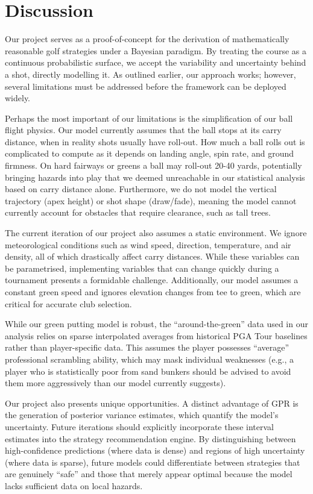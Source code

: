 \documentclass[11pt, letterpaper]{article}
\begin{document}
\section{Discussion}
\label{sec:Discussion}

Our project serves as a proof-of-concept for the derivation of mathematically reasonable golf strategies under a Bayesian paradigm. By treating the course as a continuous probabilistic surface, we accept the variability and uncertainty behind a shot, directly modelling it. As outlined earlier, our approach works; however, several limitations must be addressed before the framework can be deployed widely.

Perhaps the most important of our limitations is the simplification of our ball flight physics. Our model currently assumes that the ball stops at its carry distance, when in reality shots usually have roll-out. How much a ball rolls out is complicated to compute as it depends on landing angle, spin rate, and ground firmness. On hard fairways or greens a ball may roll-out 20-40 yards, potentially bringing hazards into play that we deemed unreachable in our statistical analysis based on carry distance alone. Furthermore, we do not model the vertical trajectory (apex height) or shot shape (draw/fade), meaning the model cannot currently account for obstacles that require clearance, such as tall trees.

The current iteration of our project also assumes a static environment. We ignore meteorological conditions such as wind speed, direction, temperature, and air density, all of which drastically affect carry distances. While these variables can be parametrised, implementing variables that can change quickly during a tournament presents a formidable challenge. Additionally, our model assumes a constant green speed and ignores elevation changes from tee to green, which are critical for accurate club selection.

While our green putting model is robust, the ``around-the-green'' data used in our analysis relies on sparse interpolated averages from historical PGA Tour baselines rather than player-specific data. This assumes the player possesses ``average'' professional scrambling ability, which may mask individual weaknesses (e.g., a player who is statistically poor from sand bunkers should be advised to avoid them more aggressively than our model currently suggests).

Our project also presents unique opportunities. A distinct advantage of GPR is the generation of posterior variance estimates, which quantify the model's uncertainty. Future iterations should explicitly incorporate these interval estimates into the strategy recommendation engine. By distinguishing between high-confidence predictions (where data is dense) and regions of high uncertainty (where data is sparse), future models could differentiate between strategies that are genuinely ``safe'' and those that merely appear optimal because the model lacks sufficient data on local hazards.
\end{document}
